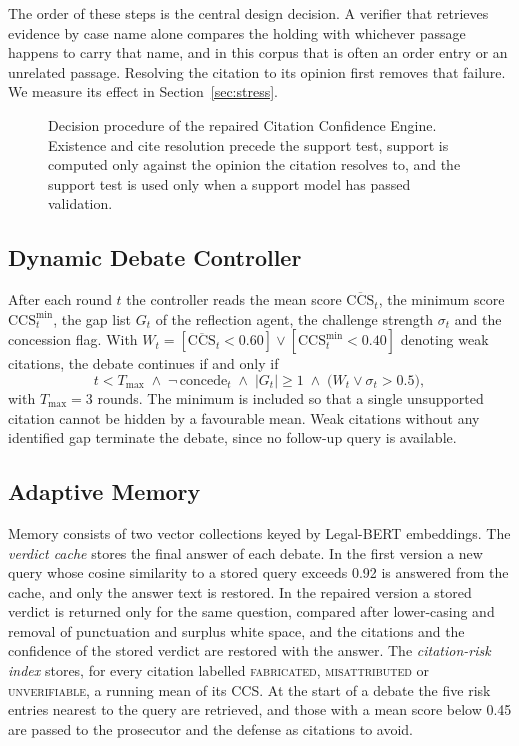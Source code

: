 \documentclass[conference]{IEEEtran}
\begin{document}
The order of these steps is the central design decision. A verifier that retrieves evidence by case name alone compares the holding with whichever passage happens to carry that name, and in this corpus that is often an order entry or an unrelated passage. Resolving the citation to its opinion first removes that failure. We measure its effect in Section~\ref{sec:stress}.

\begin{figure}[t]
\centering

\caption{Decision procedure of the repaired Citation Confidence Engine. Existence and cite resolution precede the support test, support is computed only against the opinion the citation resolves to, and the support test is used only when a support model has passed validation.}\label{fig:cce}
\end{figure}

\subsection{Dynamic Debate Controller}
After each round $t$ the controller reads the mean score $\overline{\mathrm{CCS}}_t$, the minimum score $\mathrm{CCS}^{\min}_t$, the gap list $G_t$ of the reflection agent, the challenge strength $\sigma_t$ and the concession flag. With $W_t = [\overline{\mathrm{CCS}}_t < 0.60] \lor [\mathrm{CCS}^{\min}_t < 0.40]$ denoting weak citations, the debate continues if and only if
\begin{equation}
t < T_{\max} \;\land\; \lnot\,\mathrm{concede}_t \;\land\; |G_t| \geq 1 \;\land\; \bigl(W_t \lor \sigma_t > 0.5\bigr),
\end{equation}
with $T_{\max} = 3$ rounds. The minimum is included so that a single unsupported citation cannot be hidden by a favourable mean. Weak citations without any identified gap terminate the debate, since no follow-up query is available.

\subsection{Adaptive Memory}\label{sec:memory}
Memory consists of two vector collections keyed by Legal-BERT embeddings. The \emph{verdict cache} stores the final answer of each debate. In the first version a new query whose cosine similarity to a stored query exceeds 0.92 is answered from the cache, and only the answer text is restored. In the repaired version a stored verdict is returned only for the same question, compared after lower-casing and removal of punctuation and surplus white space, and the citations and the confidence of the stored verdict are restored with the answer. The \emph{citation-risk index} stores, for every citation labelled \textsc{fabricated}, \textsc{misattributed} or \textsc{unverifiable}, a running mean of its CCS. At the start of a debate the five risk entries nearest to the query are retrieved, and those with a mean score below 0.45 are passed to the prosecutor and the defense as citations to avoid.
\end{document}
